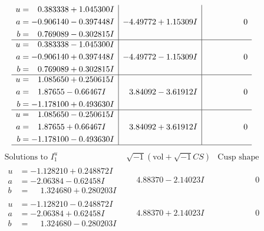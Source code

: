 \documentclass[1p]{elsarticle_modified}
\theoremstyle{definition}
\newcommand{\I}{\sqrt{-1}}
\begin{document}
$$\begin{array}{c|c|c}
\begin{aligned}
u &= \phantom{-}0.383338 + 1.045300 I \\
a &= -0.906140 - 0.397448 I \\
b &= \phantom{-}0.769089 - 0.302815 I\end{aligned}
 & -4.49772 + 1.15309 I & \phantom{-0.000000 } 0 \\ \hline\begin{aligned}
u &= \phantom{-}0.383338 - 1.045300 I \\
a &= -0.906140 + 0.397448 I \\
b &= \phantom{-}0.769089 + 0.302815 I\end{aligned}
 & -4.49772 - 1.15309 I & \phantom{-0.000000 } 0 \\ \hline\begin{aligned}
u &= \phantom{-}1.085650 + 0.250615 I \\
a &= \phantom{-}1.87655 - 0.66467 I \\
b &= -1.178100 + 0.493630 I\end{aligned}
 & \phantom{-}3.84092 - 3.61912 I & \phantom{-0.000000 } 0 \\ \hline\begin{aligned}
u &= \phantom{-}1.085650 - 0.250615 I \\
a &= \phantom{-}1.87655 + 0.66467 I \\
b &= -1.178100 - 0.493630 I\end{aligned}
 & \phantom{-}3.84092 + 3.61912 I & \phantom{-0.000000 } 0\\
 \hline 
 \end{array}$$\newpage$$\begin{array}{c|c|c}  
\text{Solutions to }I^u_{1}& \I (\text{vol} + \sqrt{-1}CS) & \text{Cusp shape}\\
 \hline 
\begin{aligned}
u &= -1.128210 + 0.248872 I \\
a &= -2.06384 - 0.62458 I \\
b &= \phantom{-}1.324680 + 0.280203 I\end{aligned}
 & \phantom{-}4.88370 - 2.14023 I & \phantom{-0.000000 } 0 \\ \hline\begin{aligned}
u &= -1.128210 - 0.248872 I \\
a &= -2.06384 + 0.62458 I \\
b &= \phantom{-}1.324680 - 0.280203 I\end{aligned}
 & \phantom{-}4.88370 + 2.14023 I & \phantom{-0.000000 } 0 \\ \hline\begin{aligned}

\end{aligned}
\end{array}$$
\end{document}
